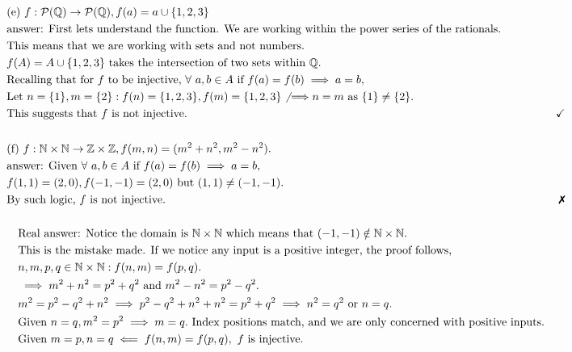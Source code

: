 \documentclass{article}
\begin{document}
\begin{align*}
            &\text{(e) }f:\power(\Q) \rightarrow \power(\Q), f(a) = a\cup\{1,2,3\}\\
            &\text{answer: First lets understand the function. We are working within the power series of the rationals.}\\
            &\text{This means that we are working with sets and not numbers. }\\
            &f(A) = A\cup\{1,2,3\}\text{ takes the intersection of two sets within }\Q.\\
            &\text{Recalling that for }f\text{ to be injective, }\all a,b\in A \text{ if }f(a) = f(b) \implies a = b,\\
            &\text{Let }n = \{1\}, m = \{2\}: f(n) = \{1,2,3\}, f(m) = \{1,2,3\} \not{\implies} n = m\text{ as } \{1\} \neq \{2\}.\\
            &\text{This suggests that }f \text{ is not injective.} &\checkmark\\
            &\\
            &\text{(f) }f:\N\times\N\rightarrow\Z\times\Z, f(m,n) = (m^2 + n^2, m^2 - n^2).\\
            &\text{answer: Given }\all a,b\in A \text{ if }f(a) = f(b) \implies a = b,\\
            &f(1,1) = (2, 0), f(-1, -1) = (2, 0) \text{ but } (1,1)\neq (-1,-1).\\
            &\text{By such logic, }f \text{ is not injective.}&\xmark\\
            &\\
            &\quad\text{Real answer: Notice the domain is }\N\times\N\text{ which means that }(-1,-1)\notin \N\times\N.\\
            &\quad\text{This is the mistake made. If we notice any input is a positive integer, the proof follows, }\\
            &\quad n,m, p, q \in \N\times\N : f(n,m) = f(p,q).\\
            &\quad \implies m^2 + n^2 = p^2 + q^2 \text{ and }m^2 - n^2 = p^2 - q^2.\\
            &\quad m^2 = p^2 - q^2 + n^2 \implies p^2 - q^2 + n^2 + n^2 = p^2 + q^2 \implies n^2 = q^2 \text{ or } n = q.\\
            &\quad \text{Given }n = q, m^2 = p^2 \implies m = q.\text{ Index positions match, and we are only concerned with positive inputs.}\\
            &\quad\text{Given }m = p, n = q \impliedby f(n,m) = f(p,q),~ f\text{ is injective.}\\
        \end{align*}
\end{document}
